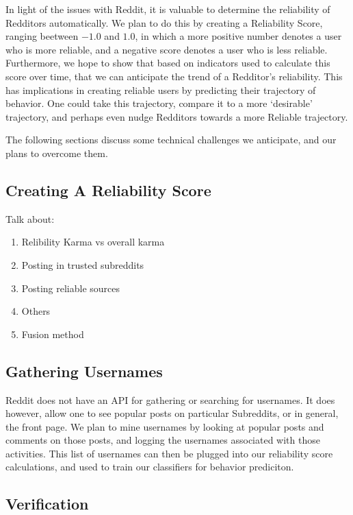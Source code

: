 In light of the issues with Reddit, it is valuable to determine the reliability
of Redditors automatically. We plan to do this by creating a Reliability Score,
ranging beetween $-1.0$ and $1.0$, in which a more positive number denotes a
user who is more reliable, and a negative score denotes a user who is less
reliable. Furthermore, we hope to show that based on indicators used to
calculate this score over time, that we can anticipate the trend of a Redditor's
reliability. This has implications in creating reliable users by predicting
their trajectory of behavior. One could take this trajectory, compare it to a
more `desirable' trajectory, and perhaps even nudge Redditors towards a more
Reliable trajectory.

The following sections discuss some technical challenges we anticipate, and our
plans to overcome them.

\subsection{Creating A Reliability Score}
\label{sub:creating_a_reliability_scorle}
Talk about:
\begin{enumerate}
    \item Relibility Karma vs overall karma
    \item Posting in trusted subreddits
    \item Posting reliable sources
    \item Others
    \item Fusion method
\end{enumerate}

\subsection{Gathering Usernames}
\label{sub:gathering_usernames}

Reddit does not have an API for gathering or searching for usernames. It does
however, allow one to see popular posts on particular Subreddits, or in general,
the front page. We plan to mine usernames by looking at popular posts and
comments on those posts, and logging the usernames associated with those
activities. This list of usernames can then be plugged into our reliability
score calculations, and used to train our classifiers for behavior prediciton.


\subsection{Verification}
\label{sub:verification}

